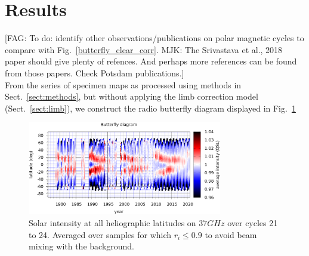 \documentclass{aa}
\newcommand{\fag}[1]{\textcolor{midpurple}{[FAG: #1]}} %
\begin{document}








\section{Results}\label{sect:results}
\fag{To do: identify other observations/publications on polar magnetic cycles to compare with
Fig.~\ref{butterfly_clear_corr}. MJK: The Srivastava et al., 2018 paper should give plenty of refences. And perhaps more references can be found from those papers. Check Potsdam publications.}\\

From the series of specimen maps as processed using methods in 
Sect.~\ref{sect:methods}, but without applying the limb correction model
(Sect.~\ref{sect:limb}), we construct the radio butterfly diagram  
displayed in Fig.~\ref{butterfly_clear_raw}

\begin{figure}
\centering
\includegraphics[width=8.5cm]{butterfly_clear_raw.png}
\caption{Solar intensity at all heliographic latitudes on $\si{37}{GHz}$ over cycles 21 to 24. Averaged over samples for which $r_i \le 0.9$ to avoid beam mixing with the background.
}
\label{butterfly_clear_raw}
\end{figure}
\end{document}
